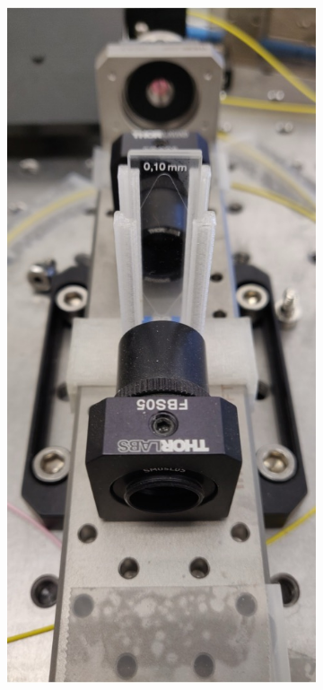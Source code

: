 \begin{figure}[t]
\begin{subfigure}[b]{0.3\textwidth}
        \label{fig:Raman:1mmCS2pic}
    \end{subfigure}
    \hfill
    \begin{subfigure}[b]{0.3\textwidth}
        \centering
        \includegraphics[width=\textwidth]{figs/4-Raman/100umCS2.jpg}

\end{subfigure}
\end{figure}
